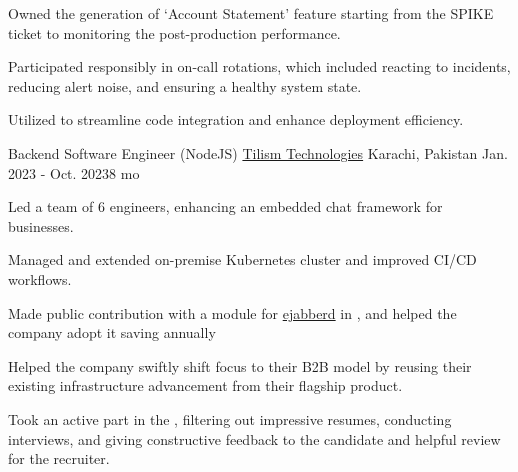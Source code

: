 \begin{cventries}
{\begin{cvitems}
      \item {Owned the generation of `Account Statement' feature starting from the SPIKE ticket to monitoring the post-production performance.}
      \item {Participated responsibly in on-call rotations, which included reacting to incidents, reducing alert noise, and ensuring a healthy system state.}
      \item {Utilized  to streamline code integration and enhance deployment efficiency.}
    \end{cvitems}
  }
      
  \cventry
  {Backend Software Engineer (NodeJS)} %
  {\href{https://www.tilismtech.com/}{Tilism Technologies}} %
  {Karachi, Pakistan} %
  {Jan. 2023 - Oct. 2023{\enskip\cdotp\enskip}8 mo} %
  {
    \begin{cvitems} %
      \item {Led a team of 6 engineers, enhancing an embedded chat framework for businesses.}
      \item {Managed and extended on-premise Kubernetes cluster and improved CI/CD workflows.}
      \item {Made public contribution with a module for \href{https://github.com/processone/ejabberd-contrib/pull/311}{\textcolor{awesome}{ejabberd}} in , and helped the company adopt it saving  annually}
      \item {Helped the company swiftly shift focus to their B2B model by reusing their existing infrastructure advancement from their flagship product.}
      \item {Took an active part in the , filtering out impressive resumes, conducting interviews, and giving constructive feedback to the candidate and helpful review for the recruiter.}
    \end{cvitems}
  }


\end{cventries}

